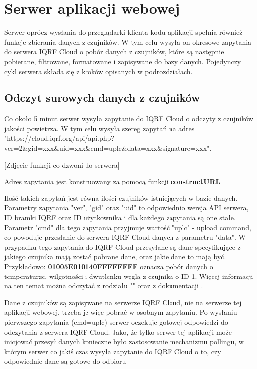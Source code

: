 \section{Serwer aplikacji webowej}

Serwer oprócz wysłania do przeglądarki klienta kodu aplikacji spełnia również funkcje zbierania danych z czujników. W tym celu wysyła on okresowe zapytania
do serwera IQRF Cloud o pobór danych z czujników, które są następnie pobierane, filtrowane, formatowane i zapisywane do bazy danych. Pojedynczy cykl serwera składa
się z kroków opisanych w podrozdziałach.

\subsection{Odczyt surowych danych z czujników}
Co około 5 minut serwer wysyła zapytanie do IQRF Cloud o odczyty z czujników jakości powietrza. W tym celu wysyła szereg zapytań na adres
"https://cloud.iqrf.org/api/api.php?ver=2\&gid=xxx\&uid=xxx\&cmd=uplc\&data=xxx\&signature=xxx".

[Zdjęcie funkcji co dzwoni do serwera]

Adres zapytania jest konstruowany za pomocą funkcji \textbf{constructURL}

Ilość takich zapytań jest równa ilości czujników istniejących
w bazie danych. Parametry zapytania "ver", "gid" oraz "uid" to odpowiednio wersja API serwera, ID bramki IQRF oraz ID użytkownika i dla każdego zapytania są one 
stałe. Parametr "cmd" dla tego zapytania przyjmuje wartość "uplc" - upload command, co powoduje przesłanie do serwera IQRF Cloud danych z parametru "data".
W przypadku tego zapytania do IQRF Cloud przesyłane są dane specyfikujące z jakiego czujnika mają zostać pobrane dane, oraz jakie dane to mają być. 
Przykładowo: \textbf{01005E010140FFFFFFFF} oznacza pobór danych o temperaturze, wilgotności i dwutlenku węgla z czujnika o ID 1. Więcej informacji na ten temat 
można odczytać z rodziału "" oraz z dokumentacji \cite{protronix-comms}.

Dane z czujników są zapisywane na serwerze IQRF Cloud, nie na serwerze tej aplikacji webowej, trzeba je więc pobrać w osobnym zapytaniu. 
Po wysłaniu pierwszego zapytania (cmd=uplc) serwer oczekuje gotowej odpowiedzi do odczytania z serwera IQRF Cloud. Jako, że tylko serwer tej aplikacji może inicjować przesył danych
konieczne było zastosowanie mechanizmu pollingu, w którym serwer co jakiś czas wysyła zapytanie do IQRF Cloud o to, czy odpowiednie dane są gotowe do odbioru

